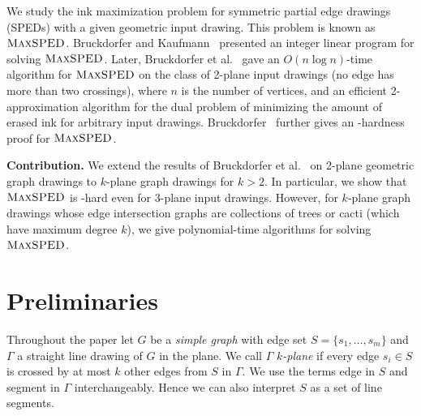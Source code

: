 \documentclass[a4paper,english,numberwithinsect]{eurocg18}
\newcommand{\maxsped}{\ensuremath{\textsc{MaxSPED}}\xspace}
\begin{document}
We study the ink maximization problem for symmetric partial edge drawings (SPEDs) with a given geometric input drawing.
This problem is known as \maxsped. 
Bruckdorfer and Kaufmann~\cite{bk-ecbe-12} presented an integer linear program for solving \maxsped. 
Later, Bruckdorfer et al.~\cite{bcgkmn-pped-17} gave an $O(n \log n)$-time algorithm for \maxsped on the class of 2-plane input drawings (no edge has more than two crossings), where $n$ is the number of vertices, and an efficient 2-approximation algorithm for the dual problem of minimizing the amount of erased ink for arbitrary input drawings.
Bruckdorfer~\cite{b-sgh-15} further gives an \NP-hardness proof for \maxsped.

\medskip

\noindent\textbf{Contribution.} We extend the results of Bruckdorfer et al.~\cite{bcgkmn-pped-17} on 2-plane geometric graph drawings to $k$-plane graph drawings for $k > 2$. 
In particular, we show that \maxsped is \NP-hard even for 3-plane input drawings. 
However, for $k$-plane graph drawings whose edge intersection graphs are collections of trees or cacti (which have maximum degree $k$), we give polynomial-time algorithms for solving \maxsped.





\section{Preliminaries}\label{sec:preliminaries}

Throughout the paper let $ G $ be a \emph{simple graph} with edge set $ S = \{s_1,\dots,s_m\}$ and $ \Gamma $ a straight line drawing of $ G $ in the plane. We call $ \Gamma $ \emph{$ k $-plane} if every edge $ s_i \in S $ is crossed by at most $ k $ other edges from $ S $ in $ \Gamma $. We use the terms edge in $ S $ and segment in $ \Gamma $ interchangeably. %
Hence we can also interpret $S$ as a set of line segments.
\end{document}
